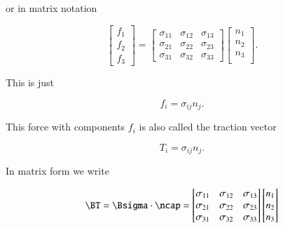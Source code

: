 or in matrix notation

\begin{equation}\label{eqn:continuumL4:370}
\begin{bmatrix}
f_1  \\
f_2  \\
f_3 
\end{bmatrix}
=
\begin{bmatrix}
\sigma_{11} & \sigma_{12} & \sigma_{13} \\
\sigma_{21} & \sigma_{22} & \sigma_{23} \\
\sigma_{31} & \sigma_{32} & \sigma_{33} 
\end{bmatrix}
\begin{bmatrix}
n_1 \\
n_2 \\
n_3 \\
\end{bmatrix}.
\end{equation}

This is just 

\begin{equation}\label{eqn:continuumL4:390}
\boxed{
f_i = \sigma_{ij} n_j.
}
\end{equation}

This force with components $f_i$ is also called the traction vector

\begin{equation}\label{eqn:continuumL4:410}
T_i = \sigma_{ij} n_j.
\end{equation}

In matrix form we write

\begin{equation}\label{eqn:continuumL5:50}
\BT = \Bsigma \cdot \ncap
=
\begin{bmatrix}
\sigma_{11} & \sigma_{12} & \sigma_{13} \\
\sigma_{21} & \sigma_{22} & \sigma_{23} \\
\sigma_{31} & \sigma_{32} & \sigma_{33}
\end{bmatrix}
\begin{bmatrix}
n_1 \\
n_2 \\
n_3
\end{bmatrix}
\end{equation}
